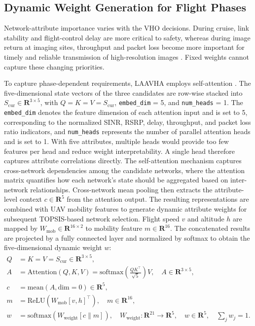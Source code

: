 \documentclass[preprint,12pt]{elsarticle}
\begin{document}
\subsection{Dynamic Weight Generation for Flight Phases}\label{sec:weight}

Network-attribute importance varies with the VHO decisions. During cruise, link stability and flight-control delay are more critical to safety, whereas during image return at imaging sites, throughput and packet loss become more important for timely and reliable transmission of high-resolution images \cite{ref24}. Fixed weights cannot capture these changing priorities.

To capture phase-dependent requirements, LAAVHA employs self-attention \cite{ref26,ref27}. The five-dimensional state vectors of the three candidates are row-wise stacked into $S_{\mathrm{cur}}\in\mathbf{R}^{3\times5}$, with $Q=K=V=S_{\mathrm{cur}}$, \texttt{embed\_dim} = 5, and \texttt{num\_heads} = 1. The \texttt{embed\_dim} denotes the feature dimension of each attention input and is set to 5, corresponding to the normalized SINR, RSRP, delay, throughput, and packet loss ratio indicators, and \texttt{num\_heads} represents the number of parallel attention heads and is set to 1. With five attributes, multiple heads would provide too few features per head and reduce weight interpretability. A single head therefore captures attribute correlations directly. The self-attention mechanism captures cross-network dependencies among the candidate networks, where the attention matrix quantifies how each network's state should be aggregated based on inter-network relationships. Cross-network mean pooling then extracts the attribute-level context $c\in\mathbf{R}^5$ from the attention output. The resulting representations are combined with UAV mobility features to generate dynamic attribute weights for subsequent TOPSIS-based network selection. Flight speed $v$ and altitude $h$ are mapped by $W_{\mathrm{mob}}\in\mathbf{R}^{16\times2}$ to mobility feature $m\in\mathbf{R}^{16}$. The concatenated results are projected by a fully connected layer and normalized by softmax to obtain the five-dimensional dynamic weight $w$:
\begin{align}
Q &= K = V = S_{\mathrm{cur}}\in\mathbf{R}^{3\times5}, \label{eq:attn1}\\
A &= \mathrm{Attention}(Q,K,V)=\mathrm{softmax}\!\left(\frac{QK^\top}{\sqrt{5}}\right)V,\quad A\in\mathbf{R}^{3\times5}, \label{eq:attn2}\\
c &= \mathrm{mean}(A,\mathrm{dim}=0)\in\mathbf{R}^5, \label{eq:attn3}\\
m &= \mathrm{ReLU}\!\left(W_{\mathrm{mob}}[v,h]^\top\right),\quad m\in\mathbf{R}^{16}, \label{eq:attn4}\\
w &= \mathrm{softmax}\!\left(W_{\mathrm{weight}}[c\parallel m]\right),\quad W_{\mathrm{weight}}:\mathbf{R}^{21}\rightarrow\mathbf{R}^{5},\quad w\in\mathbf{R}^{5},\quad \sum_j w_j=1. \label{eq:attn5}
\end{align}
\end{document}
